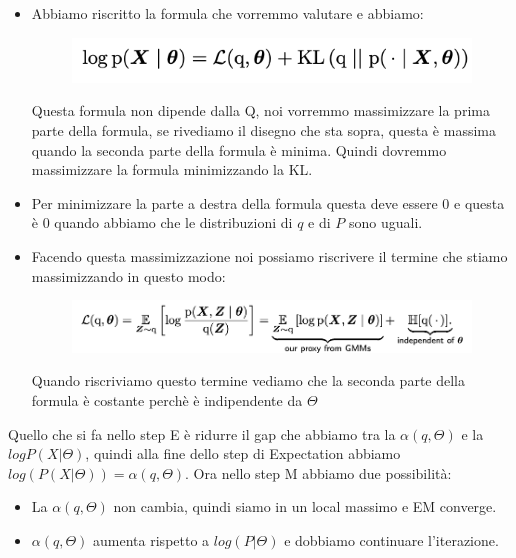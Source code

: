\documentclass[14pt]{extreport}
\begin{document}
\begin{itemize}
\item Abbiamo riscritto la formula che vorremmo valutare e abbiamo:

\begin{figure}[H] 
\centering
\includegraphics[width=0.7\linewidth]{565.jpeg}
\end{figure}

Questa formula non dipende dalla Q, noi vorremmo massimizzare la prima parte della formula, se rivediamo il disegno che sta sopra, questa è massima quando 
la seconda parte della formula è minima. Quindi dovremmo massimizzare la formula minimizzando la KL.
\item Per minimizzare la parte a destra della formula questa deve essere 0 e questa è 0 quando abbiamo che le distribuzioni di $q$ e di $P$ sono uguali.
\item Facendo questa massimizzazione noi possiamo riscrivere il termine che stiamo massimizzando in questo modo:

\begin{figure}[H] 
\centering
\includegraphics[width=0.7\linewidth]{566.jpeg}
\end{figure}

Quando riscriviamo questo termine vediamo che la seconda parte della formula è costante perchè è indipendente da $\Theta$

\end{itemize}

Quello che si fa nello step E è ridurre il gap che abbiamo tra la $\alpha(q,\Theta)$ e la $log P(X|\Theta)$, quindi alla fine dello step di Expectation abbiamo
$log(P(X|\Theta)) = \alpha(q,\Theta)$.
Ora nello step M abbiamo due possibilità:
\begin{itemize}
\item La $\alpha(q, \Theta)$ non cambia, quindi siamo in un local massimo e EM converge.
\item $\alpha(q, \Theta)$ aumenta rispetto a $log(P|\Theta)$ e dobbiamo continuare l'iterazione.
\end{itemize} 
\end{document}
